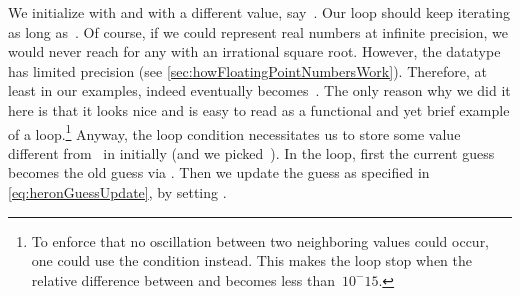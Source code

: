 We initialize  with  and  with a different value, say~.
Our  loop should keep iterating as long as~.
Of course, if we could represent real numbers at infinite precision, we would never reach  for any  with an irrational square root.
However, the  datatype has limited precision (see \cref{sec:howFloatingPointNumbersWork}).
Therefore, at least in our examples,  indeed eventually becomes~.%
%
%
%
The only reason why we did it here is that it looks nice and is easy to read as a functional and yet brief example of a  loop.\footnote{%
To enforce that no oscillation between two neighboring  values could occur, one could use the condition  instead. %
This makes the loop stop when the relative difference between  and  becomes less than~$10^-{15}$.%
}%
Anyway, the loop condition necessitates us to store some value different from~ in  initially (and we picked~).
In the loop, first the current guess becomes the old guess via .
Then we update the guess as specified in \cref{eq:heronGuessUpdate}, by setting .

